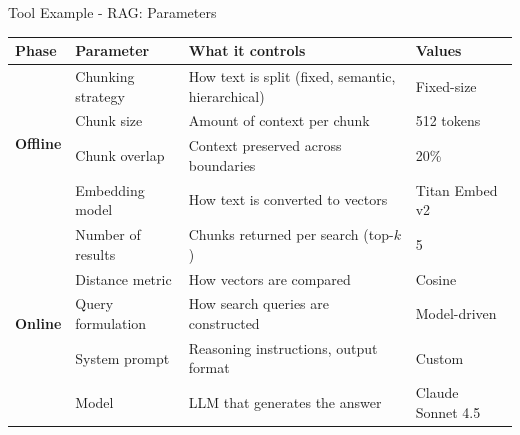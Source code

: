 \begin{frame}{Tool Example - RAG: Parameters}
\scriptsize
\centering
\begin{tabular}{llp{5.0cm}l}
\toprule
\textbf{Phase} & \textbf{Parameter} & \textbf{What it controls} & \textbf{Values} \\
\midrule
\multirow{4}{*}{\textbf{Offline}}
  & Chunking strategy & How text is split (fixed, semantic, hierarchical) & Fixed-size \\
  & Chunk size        & Amount of context per chunk                       & 512 tokens \\
  & Chunk overlap     & Context preserved across boundaries               & 20\% \\
  & Embedding model   & How text is converted to vectors                  & Titan Embed v2 \\
\midrule
\multirow{5}{*}{\textbf{Online}}
  & Number of results & Chunks returned per search (top-$k$)              & 5 \\
  & Distance metric   & How vectors are compared                          & Cosine \\  
  & Query formulation & How search queries are constructed                & Model-driven \\
\midrule
\multirow{2}{*}{\textbf{Generation}}
  & System prompt     & Reasoning instructions, output format             & Custom \\
  & Model             & LLM that generates the answer                     & Claude Sonnet 4.5 \\
\bottomrule
\end{tabular}
\vspace{0.3em}


\end{frame}

